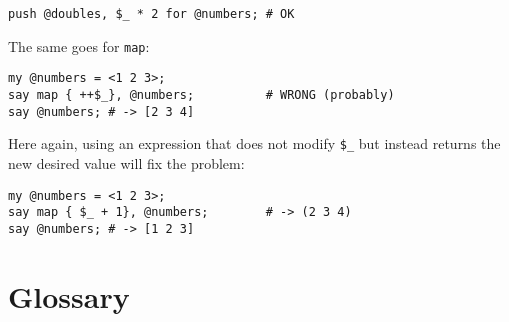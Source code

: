 \begin{enumerate}
\begin{verbatim}
push @doubles, $_ * 2 for @numbers; # OK
\end{verbatim}

The same goes for {\tt map}:

\begin{verbatim}
my @numbers = <1 2 3>;
say map { ++$_}, @numbers;          # WRONG (probably)
say @numbers; # -> [2 3 4]
\end{verbatim}
%

Here again, using an expression that does not modify \verb'$_' 
but instead returns the new desired value will fix the problem:

\begin{verbatim}
my @numbers = <1 2 3>;
say map { $_ + 1}, @numbers;        # -> (2 3 4)
say @numbers; # -> [1 2 3]
\end{verbatim}
%

\end{enumerate}



\section{Glossary}


